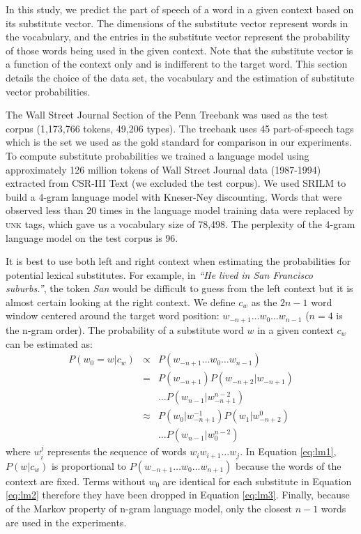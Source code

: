 \documentclass[11pt]{article}
\begin{document}
In this study, we predict the part of speech of a word in a given
context based on its substitute vector.  The dimensions of the
substitute vector represent words in the vocabulary, and the entries
in the substitute vector represent the probability of those words
being used in the given context.  Note that the substitute vector is a
function of the context only and is indifferent to the target word.
This section details the choice of the data set, the vocabulary and
the estimation of substitute vector probabilities.

The Wall Street Journal Section of the Penn Treebank \cite{treebank3}
was used as the test corpus (1,173,766 tokens, 49,206 types).
The treebank uses 45 part-of-speech tags which is the set we used as
the gold standard for comparison in our experiments.
To compute substitute probabilities we trained a language model using
approximately 126 million tokens of Wall Street Journal data
(1987-1994) extracted from CSR-III Text \cite{csr3text} (we excluded
the test corpus).
We used SRILM \cite{Stolcke2002} to build a 4-gram language model with
Kneser-Ney discounting.
Words that were observed less than 20 times in the language model training data
were replaced by \textsc{unk} tags, which gave us a vocabulary size of
78,498.
The perplexity of the 4-gram language model on the test corpus is 96.

It is best to use both left and right context when estimating the
probabilities for potential lexical substitutes.  For example, in
\emph{``He lived in San Francisco suburbs.''}, the token \emph{San}
would be difficult to guess from the left context but it is almost
certain looking at the right context.  We define $c_w$ as the $2n-1$
word window centered around the target word position: $w_{-n+1} \ldots
w_0 \ldots w_{n-1}$ ($n=4$ is the n-gram order).  The probability of a
substitute word $w$ in a given context $c_w$ can be estimated as:
\begin{eqnarray}
  \label{eq:lm1}P(w_0 = w | c_w) & \propto & P(w_{-n+1}\ldots w_0\ldots w_{n-1})\\
  \label{eq:lm2}& = & P(w_{-n+1})P(w_{-n+2}|w_{-n+1})\nonumber\\
  &&\ldots P(w_{n-1}|w_{-n+1}^{n-2})\\
  \label{eq:lm3}& \approx & P(w_0| w_{-n+1}^{-1})P(w_{1}|w_{-n+2}^0)\nonumber\\
  &&\ldots P(w_{n-1}|w_0^{n-2})
\end{eqnarray}
where $w_i^j$ represents the sequence of words $w_i w_{i+1} \ldots
w_{j}$.  In Equation \ref{eq:lm1}, $P(w|c_w)$ is proportional to
$P(w_{-n+1}\ldots w_0 \ldots w_{n+1})$ because the words of the
context are fixed.  Terms without $w_0$ are identical for each
substitute in Equation \ref{eq:lm2} therefore they have been dropped
in Equation \ref{eq:lm3}.  Finally, because of the Markov property of
n-gram language model, only the closest $n-1$ words are used in the
experiments.
\end{document}
